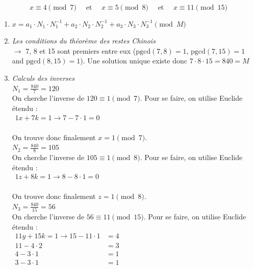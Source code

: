 \begin{solution}
    \text{ } \\
    \[ x \equiv 4 \pmod{7} \quad \text{ et } \quad x \equiv 5 \pmod{8} \quad \text{ et } \quad x \equiv 11 \pmod{15} \]

    \begin{enumerate}

        \item \(x = a_1 \cdot N_{1} \cdot N_{1}^{-1} + a_2 \cdot N_{2} \cdot N_{2}^{-1} + a_3 \cdot N_{3} \cdot N_{3}^{-1} \pmod{M}\)
        
        \item \textit{Les conditions du théorème des restes Chinois} \\
        $\rightarrow$ 7, 8 et 15 sont premiers entre eux (\(\text{pgcd}(7,8) = 1 \), \(\text{pgcd}(7,15) = 1 \) and \(\text{pgcd}(8,15) = 1 \)). Une solution unique existe donc \(7 \cdot 8 \cdot 15 = 840 = M \)

        \item \textit{Calculs des inverses} \\
        \(N_1 = \frac{840}{7} = 120 \) \\
        On cherche l'inverse de $120 \equiv 1 \pmod{7}$. Pour se faire, on utilise Euclide étendu : \\
         \( 
        \begin{aligned}
            1 x + 7 k = 1 \rightarrow 7 - 7 \cdot 1 = 0 \\
        \end{aligned}
        \)

        On trouve donc finalement $x = 1 \pmod{7}$. \\
        
        \(N_2 = \frac{840}{8} = 105\) \\
        On cherche l'inverse de $105 \equiv 1 \pmod{8}$. Pour se faire, on utilise Euclide étendu : \\
        \( 
        \begin{aligned}
            1 z + 8 k = 1 \rightarrow 8 - 8 \cdot 1 = 0 \\
        \end{aligned}
        \)
        
        On trouve donc finalement $z = 1 \pmod{8}$. \\

        \(N_3 = \frac{840}{15} = 56 \) \\
        On cherche l'inverse de $56 \equiv 11 \pmod{15}$. Pour se faire, on utilise Euclide étendu : \\
        \( 
        \begin{aligned}
            11 y + 15 k = 1 \rightarrow 15 - 11 \cdot 1 &= 4 \\
                                        11 - 4 \cdot 2 &= 3 \\
                                        4 - 3 \cdot 1 &= 1 \\
                                        3 - 3 \cdot 1 &= 1 \\
        \end{aligned}
        \)


\end{enumerate}
\end{solution}
